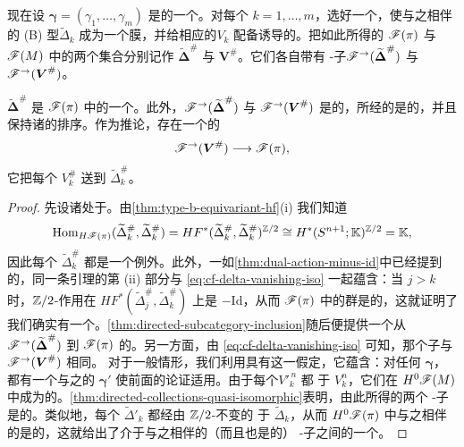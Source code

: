 现在设 $\boldsymbol{\gamma}=(\gamma_1,\ldots,\gamma_m)$ 是\trVanishingPath{}的一个\trDistinguishedBasis。对每个 $k=1,\ldots,m$，选好一个\trGrading，使与之相伴的 (B) 型\trLagrange\trSubmanifold{}$\widetilde{\Delta}_k$ 成为一个\trEquivariant{}膜，并给相应的\trVanishingCycle{}$V_k$ 配备诱导的\trBraneStructure。把如此所得的 $\mathscr{F}(\pi)$ 与 $\mathscr{F}(M)$ 中\trObject{}的两个集合分别记作 $\widetilde{\boldsymbol{\Delta}}^{\#}$ 与 $\boldsymbol{V}^{\#}$。它们各自带有\trDirected{} \trAinfty-子\trCategory{}$\mathscr{F}^{\rightarrow}(\widetilde{\boldsymbol{\Delta}}^{\#})$ 与 $\mathscr{F}^{\rightarrow}(\boldsymbol{V}^{\#})$。
\begin{proposition}\label{thm:fibration-exceptional-collection}
$\widetilde{\boldsymbol{\Delta}}^{\#}$ 是 $\mathscr{F}(\pi)$ 中的一个\trExceptionalCollection。此外，$\mathscr{F}^{\rightarrow}(\widetilde{\boldsymbol{\Delta}}^{\#})$ 与 $\mathscr{F}^{\rightarrow}(\boldsymbol{V}^{\#})$ 是\trQuasiisomorphic{}的，所经的\trAFunctor{}是\trStrictlyUnital{}的，并且保持诸\trObject{}的排序。作为推论，存在一个\trCohomology{}\trFullyFaithful{}的 \trAFunctor
\begin{equation*}
\mathscr{F}^{\rightarrow}(\boldsymbol{V}^{\#})\longrightarrow\mathscr{F}(\pi),
\end{equation*}
它把每个 $V^{\#}_k$ 送到 $\widetilde{\Delta}^{\#}_k$。
\end{proposition}
\begin{proof}
先设诸\trVanishingCycle{}处于\trGeneralPosition{}。由\cref{thm:type-b-equivariant-hf}(i) 我们知道
\begin{equation*}
\operatorname{Hom}_{H\mathscr{F}(\pi)}(\widetilde{\Delta}^{\#}_k,\widetilde{\Delta}^{\#}_k)
=HF^*(\widetilde{\Delta}^{\#}_k,\widetilde{\Delta}^{\#}_k)^{\mathbb{Z}/2}
\cong H^*(S^{n+1};\mathbb{K})^{\mathbb{Z}/2}=\mathbb{K},
\end{equation*}
因此每个 $\widetilde{\Delta}^{\#}_k$ 都是一个例外\trObject。此外，一如\cref{thm:dual-action-minus-id}中已经提到的，同一条引理的第 (ii) 部分与 \eqref{eq:cf-delta-vanishing-iso} 一起蕴含：当 $j>k$ 时，$\mathbb{Z}/2$-作用在 $HF^*(\widetilde{\Delta}^{\#}_j,\widetilde{\Delta}^{\#}_k)$ 上是 $-\mathrm{Id}$，从而 $\mathscr{F}(\pi)$ 中的\trMorphism{}群是\trAcyclic{}的，这就证明了我们确实有一个\trExceptionalCollection。\cref{thm:directed-subcategory-inclusion}随后便提供一个从 $\mathscr{F}^{\rightarrow}(\widetilde{\boldsymbol{\Delta}}^{\#})$ 到 $\mathscr{F}(\pi)$ 的\trCohomology{}\trFullyFaithful{}\trFunctor。另一方面，由 \eqref{eq:cf-delta-vanishing-iso} 可知，那个\trDirected{}子\trCategory{}与 $\mathscr{F}^{\rightarrow}(\boldsymbol{V}^{\#})$ 相同。
对于一般情形，我们利用\trLefschetzFibration{}具有\trGeneric\trParallelTransport{}这一假定，它蕴含：对任何 $\boldsymbol{\gamma}$，都有一个与之\trHomotopic{}的 $\boldsymbol{\gamma}'$ 使前面的论证适用。由于每个\trVanishingCycle{}$V'^{\,n}_k$ 都 \trIsotopy{}于 $V^n_k$，它们在 $H^0\mathscr{F}(M)$ 中成为\trIsomorphic{}的\trObject。\cref{thm:directed-collections-quasi-isomorphic}表明，由此所得的两个\trDirected{} \trAinfty-子\trCategory{}是\trQuasiisomorphic{}的。类似地，每个 $\widetilde{\Delta}'_k$ 都经由 $\mathbb{Z}/2$-不变的\trLagrange\trSubmanifold{} \trIsotopy{}于 $\widetilde{\Delta}_k$，从而 $H^0\mathscr{F}(\pi)$ 中与之相伴的\trObject{}是\trIsomorphic{}的，这就给出了介于与之相伴的（而且也是\trFull{}的）\trDirected{} \trAinfty-子\trCategory{}之间的一个\trQuasiisomorphism。
\end{proof}
